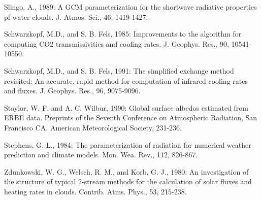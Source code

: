 Slingo, A., 1989\+: A G\+CM parameterization for the shortwave radiative properties pf water clouds. J. Atmos. Sci., 46, 1419-\/1427.

Schwarzkopf, M.\+D., and S. B. Fels, 1985\+: Improvements to the algorithm for computing C\+O2 transmissivities and cooling rates. J. Geophys. Res., 90, 10541-\/10550.

Schwarzkopf, M.\+D., and S. B. Fels, 1991\+: The simplified exchange method revisited\+: An accurate, rapid method for computation of infrared cooling rates and fluxes. J. Geophys. Res., 96, 9075-\/9096.

Staylor, W. F. and A. C. Wilbur, 1990\+: Global surface albedos estimated from E\+R\+BE data. Preprints of the Seventh Conference on Atmospheric Radiation, San Francisco CA, American Meteorological Society, 231-\/236.

Stephens, G. L., 1984\+: The parameterization of radiation for numerical weather prediction and climate models. Mon. Wea. Rev., 112, 826-\/867.

Zdunkowski, W. G., Welsch, R. M., and Korb, G. J., 1980\+: An investigation of the structure of typical 2-\/stream methods for the calculation of solar fluxes and heating rates in clouds. Contrib. Atms. Phys., 53, 215-\/238. 